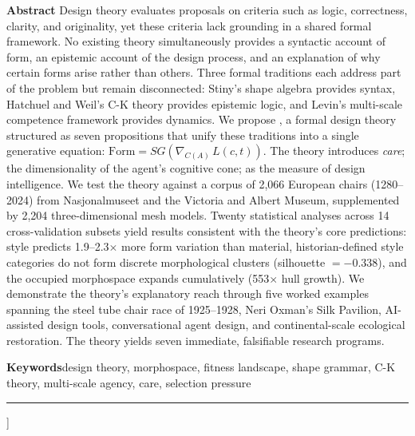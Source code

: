 {\begin{@twocolumnfalse}
{\begin{minipage}{0.94\textwidth}
{\footnotesize
\noindent\textbf{Abstract}\quad
Design theory evaluates proposals on criteria such as logic, correctness, clarity, and originality, yet these criteria lack grounding in a shared formal framework. No existing theory simultaneously provides a syntactic account of form, an epistemic account of the design process, and an explanation of why certain forms arise rather than others. Three formal traditions each address part of the problem but remain disconnected: Stiny's shape algebra provides syntax, Hatchuel and Weil's C-K theory provides epistemic logic, and Levin's multi-scale competence framework provides dynamics. We propose \formlaere{}, a formal design theory structured as seven propositions that unify these traditions into a single generative equation: $\mathrm{Form} = SG(\nabla_{C(A)}\, L(c,t))$. The theory introduces \textit{care}; the dimensionality of the agent's cognitive cone; as the measure of design intelligence. We test the theory against a corpus of 2,066 European chairs (1280--2024) from Nasjonalmuseet and the Victoria and Albert Museum, supplemented by 2,204 three-dimensional mesh models. Twenty statistical analyses across 14 cross-validation subsets yield results consistent with the theory's core predictions: style predicts 1.9--2.3$\times$ more form variation than material, historian-defined style categories do not form discrete morphological clusters (silhouette $= -0.338$), and the occupied morphospace expands cumulatively (553$\times$ hull growth). We demonstrate the theory's explanatory reach through five worked examples spanning the steel tube chair race of 1925--1928, Neri Oxman's Silk Pavilion, AI-assisted design tools, conversational agent design, and continental-scale ecological restoration. The theory yields seven immediate, falsifiable research programs.

\vspace{4pt}
\noindent\textbf{Keywords}\quad design theory, morphospace, fitness landscape, shape grammar, C-K theory, multi-scale agency, care, selection pressure
}

\vspace{4pt}
\noindent\rule{\textwidth}{0.4pt}
\end{minipage}
\par}

\vspace{8pt}

\end{@twocolumnfalse}
}]










\begingroup
\small
\printbibliography[title={References}]
\endgroup


